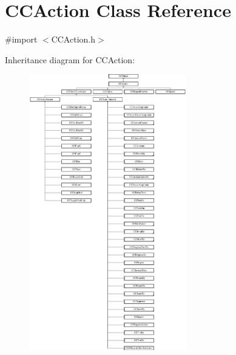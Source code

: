 \hypertarget{interface_c_c_action}{\section{C\-C\-Action Class Reference}
\label{interface_c_c_action}
}


{\ttfamily \#import $<$C\-C\-Action.\-h$>$}

Inheritance diagram for C\-C\-Action\-:\begin{figure}[H]
\begin{center}
\leavevmode
\includegraphics[height=12.000000cm]{interface_c_c_action}
\end{center}
\end{figure}

